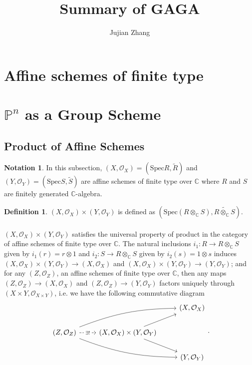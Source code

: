 \documentclass{article}
\title{Summary of GAGA}
\date{}
\author{Jujian Zhang}
\theoremstyle{definition}
\newtheorem{definition}{Definition}
\newtheorem*{notation}{Notation}
\newcommand{\Spec}{\mathrm{Spec}}
\newcommand{\ssheaf}[1]{\widetilde{#1}}
\newcommand{\tensorC}[2]{#1\otimes_\mathbb C #2}
\newcommand{\tensor}[2]{#1\otimes#2}
\newcommand{\so}[1]{(#1, \mathcal O_{#1})}
\begin{document}
\maketitle

\section{Affine schemes of finite type}
\section{$\mathbb P^n$ as a Group Scheme}

\subsection{Product of Affine Schemes}

\begin{notation}
In this subsection, $(X, \mathcal O_X)=(\Spec R,\ssheaf R)$ and $(Y,\mathcal O_Y)=(\Spec S, \ssheaf S)$ are affine schemes of finite type over $\mathbb C$ where $R$ and $S$ are finitely generated $\mathbb C$-algebra.
\end{notation}

\begin{definition}
	$\so X\times \so Y$ is defined as $(\Spec(\tensorC R S),\ssheaf{\tensorC R S})$.
\end{definition}

\paragraph{} $\so X\times \so Y$ satisfies the universal property of product in the category of affine schemes of finite type over $\mathbb C$. The natural inclusions $i_1:R\to \tensorC R S$ given by $i_1(r)=\tensor r 1$ and $i_2:S\to \tensorC R S$ given by $i_2(s)=\tensor 1 s$ induces $\so{X}\times\so Y\to \so X$ and $\so{X}\times\so Y\to \so Y$; and for any $\so Z$, an affine schemes of finite type over $\mathbb C$, then any maps $\so Z \to \so X$ and $\so Z\to\so Y$ factors uniquely through $\so{X\times Y}$, i.e. we have the following commutative diagram
\[
\begin{tikzcd}
 & & \so X\\
\so Z \arrow[rru, bend left=10] \arrow[rrd, bend right=10] \arrow[r, dashed, "\exists!" description] & \so{X}\times\so Y \arrow[ru] \arrow[rd]\\
 & & \so Y
\end{tikzcd}.
\]
\end{document}

